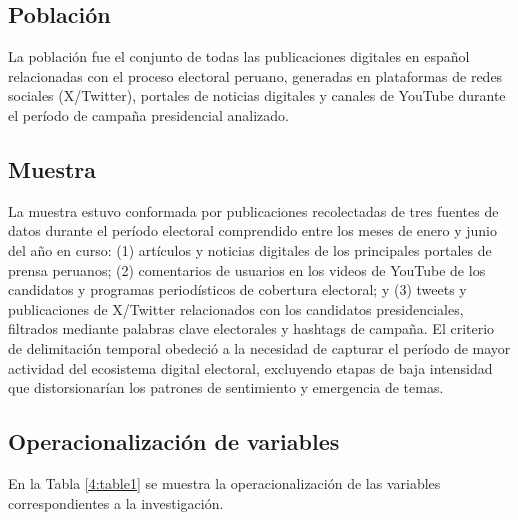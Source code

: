 \documentclass[listof=nochaptergap,12pt,times,authoryear]{report}
\begin{document}
\subsection{Población}
 
La población fue el conjunto de todas las publicaciones digitales en español relacionadas
con el proceso electoral peruano, generadas en plataformas de redes sociales (X/Twitter),
portales de noticias digitales y canales de YouTube durante el período de campaña
presidencial analizado.
 
\subsection{Muestra}
 
La muestra estuvo conformada por publicaciones recolectadas de tres fuentes de datos
durante el período electoral comprendido entre los meses de enero y junio del año en
curso: (1) artículos y noticias digitales de los principales portales de prensa peruanos;
(2) comentarios de usuarios en los videos de YouTube de los candidatos y programas
periodísticos de cobertura electoral; y (3) tweets y publicaciones de X/Twitter
relacionados con los candidatos presidenciales, filtrados mediante palabras clave
electorales y hashtags de campaña. El criterio de delimitación temporal obedeció a la
necesidad de capturar el período de mayor actividad del ecosistema digital electoral,
excluyendo etapas de baja intensidad que distorsionarían los patrones de sentimiento y
emergencia de temas.
 
\subsection{Operacionalización de variables}
 
En la Tabla \ref{4:table1} se muestra la operacionalización de las variables correspondientes a la investigación.
 
\end{document}

